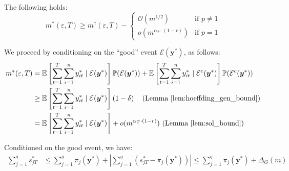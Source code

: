 \documentclass[nonblindrev]{informs3noheader}
\def\E{\mathbb{E}}
\def\P{\mathbb{P}}
\def\calE{\mathcal{E}}
\def\calO{\mathcal{O}}
\def\by{\boldsymbol{y}}
\begin{document}
\begin{lemma}\label{lem:network_deter_stochstic}
    The following holds:
    \begin{equation*}
    m^*(\varepsilon, T)
    \geq m^\dagger (\varepsilon, T)- \begin{cases}
    	\calO\left(m^{1/2}\right) & \text{if }p \neq 1\\
    	o\left(m^{\alpha_T\cdot(1-r)}\right) & \text{if }p = 1
    \end{cases} 
    \end{equation*}
\end{lemma}
We proceed by conditioning on the ``good'' event $\calE(\by^*)$, as follows:
\begin{align*}
    m^*(\varepsilon, T)
    &=\E\left[\sum_{t=1}^T \sum_{i=1}^n  y^*_{it} \mid \calE(\by^*)\right]\P(\calE(\by^*))+\E\left[\sum_{t=1}^T \sum_{i=1}^n  y^*_{it} \mid \calE^c(\by^*)\right]\P(\calE^c(\by^*))\\
    &\geq \E\left[\sum_{t=1}^T \sum_{i=1}^n  y^*_{it} \mid \calE(\by^*)\right]\left(1-\delta\right)\quad\text{(Lemma~\ref{lem:hoeffding_gen_bound})}\\
    &=\E\left[\sum_{t=1}^T \sum_{i=1}^n  y^*_{it} \mid \calE(\by^*)\right] + o(m^{\alpha_T\cdot(1-r)})\ \text{(Lemma~\ref{lem:sol_bound})}
\end{align*}

Conditioned on the good event, we have:
\begin{align*}
    \sum_{j=1}^q s^*_{jT}&\leq \sum_{j=1}^q \pi_{j}(\by^*)+\left|\sum_{j=1}^q (s^*_{jT}-\pi_{j}(\by^*))\right|\leq\sum_{j=1}^q \pi_{j}(\by^*)+\Delta_G(m)
\end{align*}
\end{document}

